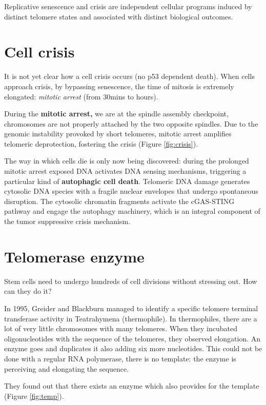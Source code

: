 Replicative senescence and crisis are independent cellular programs
induced by distinct telomere states and associated with distinct
biological outcomes.

\hypertarget{cell-crisis}{%
\section{Cell crisis}\label{cell-crisis}}

It is not yet clear how a cell crisis occurs (no p53 dependent death).
When cells approach crisis, by bypassing senescence, the time of mitosis
is extremely elongated: \emph{mitotic arrest} (from 30mins to hours).

During the \textbf{mitotic arrest,} we are at the spindle assembly
checkpoint, chromosomes are not properly attached by the two opposite
spindles. Due to the genomic instability provoked by short telomeres,
mitotic arrest amplifies telomeric deprotection, fostering the crisis (Figure \ref{fig:crisis}).

The way in which cells die is only now being discovered: during the prolonged
mitotic arrest exposed DNA activates DNA sensing mechanisms, triggering
a particular kind of \textbf{autophagic cell death}. Telomeric DNA
damage generates cytosolic DNA species with a fragile nuclear envelopes
that undergo spontaneous disruption. The cytosolic chromatin fragments
activate the cGAS-STING pathway and engage the autophagy machinery,
which is an integral component of the tumor suppressive crisis
mechanism.

\hypertarget{telomerase-enzyme}{%
\section{Telomerase enzyme}\label{telomerase-enzyme}}

Stem cells need to undergo hundreds of cell divisions without stressing
out. How can they do it?

In 1995, Greider and Blackburn managed to identify a specific telomere
terminal transferase activity in Teatrahymena (thermophile). In
thermophiles, there are a lot of very little chromosomes with many
telomeres. When they incubated oligonucleotides with the sequence of the
telomeres, they observed elongation. An enzyme goes and duplicates it
also adding six more nucleotides. This could not be done with a regular
RNA polymerase, there is no template: the enzyme is perceiving and
elongating the sequence.

They found out that there exists an enzyme which also provides for the
template (Figure \ref{fig:temp}).

